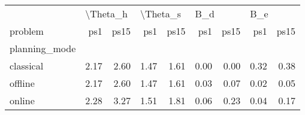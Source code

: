 \begin{tabular}{lrrrrrrrr}
\toprule
{} & \multicolumn{2}{l}{\textbackslash Theta\_h} & \multicolumn{2}{l}{\textbackslash Theta\_s} & \multicolumn{2}{l}{B\_d} & \multicolumn{2}{l}{B\_e} \\
problem &      ps1 & ps15 &      ps1 & ps15 &  ps1 & ps15 &  ps1 & ps15 \\
planning\_mode &          &      &          &      &      &      &      &      \\
\midrule
classical     &     2.17 & 2.60 &     1.47 & 1.61 & 0.00 & 0.00 & 0.32 & 0.38 \\
offline       &     2.17 & 2.60 &     1.47 & 1.61 & 0.03 & 0.07 & 0.02 & 0.05 \\
online        &     2.28 & 3.27 &     1.51 & 1.81 & 0.06 & 0.23 & 0.04 & 0.17 \\
\bottomrule
\end{tabular}

